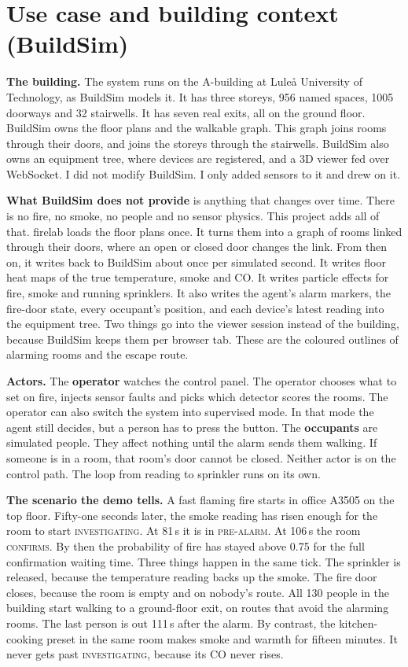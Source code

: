 \section{Use case and building context (BuildSim)}\label{sec:usecase}

\textbf{The building.} The system runs on the A-building at Luleå University of
Technology, as BuildSim models it. It has three storeys, 956 named spaces, 1005
doorways and 32 stairwells. It has seven real exits, all on the ground floor.
BuildSim owns the floor plans and the walkable graph. This graph joins rooms through
their doors, and joins the storeys through the stairwells. BuildSim also owns an
equipment tree, where devices are registered, and a 3D viewer fed over WebSocket. I
did not modify BuildSim. I only added sensors to it and drew on it.

\textbf{What BuildSim does not provide} is anything that changes over time. There
is no fire, no smoke, no people and no sensor physics. This project adds all of that.
firelab loads the floor plans once. It turns them into a graph of rooms linked
through their doors, where an open or closed door changes the link. From then on, it
writes back to BuildSim about once per simulated second. It writes floor heat maps of
the true temperature, smoke and CO. It writes particle effects for fire, smoke and
running sprinklers. It also writes the agent's alarm markers, the fire-door state,
every occupant's position, and each device's latest reading into the equipment tree.
Two things go into the viewer session instead of the building, because BuildSim
keeps them per browser tab. These are the coloured outlines of alarming rooms and
the escape route.

\textbf{Actors.} The \textbf{operator} watches the control panel. The operator
chooses what to set on fire, injects sensor faults and picks which detector scores
the rooms. The operator can also switch the system into supervised mode. In that
mode the agent still decides, but a person has to press the button. The
\textbf{occupants} are simulated people. They affect nothing until the alarm sends
them walking. If someone is in a room, that room's door cannot be closed. Neither
actor is on the control path. The loop from reading to sprinkler runs on its own.

\textbf{The scenario the demo tells.} A fast flaming fire starts in office A3505
on the top floor. Fifty-one seconds later, the smoke reading has risen enough for the
room to start \textsc{investigating}. At 81\,s it is in \textsc{pre-alarm}. At
106\,s the room \textsc{confirms}. By then the probability of fire has stayed above
0.75 for the full confirmation waiting time. Three things happen in the same tick.
The sprinkler is released, because the temperature reading backs up the smoke. The
fire door closes, because the room is empty and on nobody's route. All 130 people in
the building start walking to a ground-floor exit, on routes that avoid the alarming
rooms. The last person is out 111\,s after the alarm. By contrast, the
kitchen-cooking preset in the same room makes smoke and warmth for fifteen minutes.
It never gets past \textsc{investigating}, because its CO never rises.

